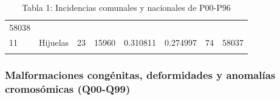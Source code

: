 \documentclass[]{article}
\begin{document}
\begin{longtable}[]{@{}llllllll@{}}
\begin{minipage}[t]{0.10\columnwidth}
58038\strut
\end{minipage}\tabularnewline
\begin{minipage}[t]{0.03\columnwidth}\raggedright
11\strut
\end{minipage} & \begin{minipage}[t]{0.09\columnwidth}\raggedright
Hijuelas\strut
\end{minipage} & \begin{minipage}[t]{0.14\columnwidth}\raggedright
23\strut
\end{minipage} & \begin{minipage}[t]{0.13\columnwidth}\raggedright
15960\strut
\end{minipage} & \begin{minipage}[t]{0.10\columnwidth}\raggedright
0.310811\strut
\end{minipage} & \begin{minipage}[t]{0.09\columnwidth}\raggedright
0.274997\strut
\end{minipage} & \begin{minipage}[t]{0.11\columnwidth}\raggedright
74\strut
\end{minipage} & \begin{minipage}[t]{0.10\columnwidth}\raggedright
58037\strut
\end{minipage}\tabularnewline
\bottomrule
\caption{Tabla 1: Incidencias comunales y nacionales de P00-P96}
\end{longtable}

\hypertarget{malformaciones-conguxe9nitas-deformidades-y-anomaluxedas-cromosuxf3micas-q00-q99}{%
\subsubsection{Malformaciones congénitas, deformidades y anomalías
cromosómicas
(Q00-Q99)}\label{malformaciones-conguxe9nitas-deformidades-y-anomaluxedas-cromosuxf3micas-q00-q99}}
\end{document}
